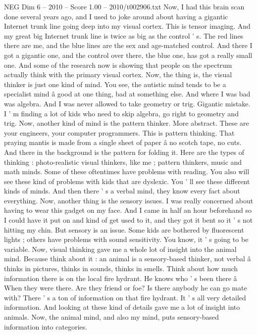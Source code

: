 \begin{textsample}{NEG Dim 6 – 2010 – Score 1.00 – 2010/t002906.txt}
Now, I had this brain scan done several years ago, and I used to joke around about having a gigantic Internet trunk line going deep into my visual cortex.
This is tensor imaging.
And my great big Internet trunk line is twice as big as the control ' s.
The red lines there are me, and the blue lines are the sex and age-matched control.
And there I got a gigantic one, and the control over there, the blue one, has got a really small one.
And some of the research now is showing that people on the spectrum actually think with the primary visual cortex.
Now, the thing is, the visual thinker is just one kind of mind.
You see, the autistic mind tends to be a specialist mind â good at one thing, bad at something else.
And where I was bad was algebra.
And I was never allowed to take geometry or trig.
Gigantic mistake.
I ' m finding a lot of kids who need to skip algebra, go right to geometry and trig.
Now, another kind of mind is the pattern thinker.
More abstract.
These are your engineers, your computer programmers.
This is pattern thinking.
That praying mantis is made from a single sheet of paper â no scotch tape, no cuts.
And there in the background is the pattern for folding it.
Here are the types of thinking : photo-realistic visual thinkers, like me ; pattern thinkers, music and math minds.
Some of these oftentimes have problems with reading.
You also will see these kind of problems with kids that are dyslexic.
You ' ll see these different kinds of minds.
And then there ' s a verbal mind, they know every fact about everything.
Now, another thing is the sensory issues.
I was really concerned about having to wear this gadget on my face.
And I came in half an hour beforehand so I could have it put on and kind of get used to it, and they got it bent so it ' s not hitting my chin.
But sensory is an issue.
Some kids are bothered by fluorescent lights ; others have problems with sound sensitivity.
You know, it ' s going to be variable.
Now, visual thinking gave me a whole lot of insight into the animal mind.
Because think about it : an animal is a sensory-based thinker, not verbal â thinks in pictures, thinks in sounds, thinks in smells.
Think about how much information there is on the local fire hydrant.
He knows who ' s been there â When they were there.
Are they friend or foe?
Is there anybody he can go mate with?
There ' s a ton of information on that fire hydrant.
It ' s all very detailed information.
And looking at these kind of details gave me a lot of insight into animals.
Now, the animal mind, and also my mind, puts sensory-based information into categories.

\end{textsample}
